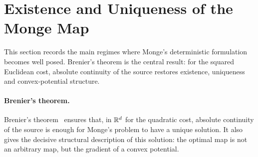 \section{Existence and Uniqueness of the Monge Map}
\label{sec-monge-existence-uniqueness}

This section records the main regimes where Monge's deterministic formulation becomes well posed. Brenier's theorem is the central result: for the squared Euclidean cost, absolute continuity of the source restores existence, uniqueness and convex-potential structure.

\paragraph{Brenier's theorem.}

Brenier's theorem~\cite{MR923203,Brenier91} ensures that, in $\mathbb{R}^d$ for the quadratic cost, absolute continuity of the source is enough for Monge's problem to have a unique solution. It also gives the decisive structural description of this solution: the optimal map is not an arbitrary map, but the gradient of a convex potential.

